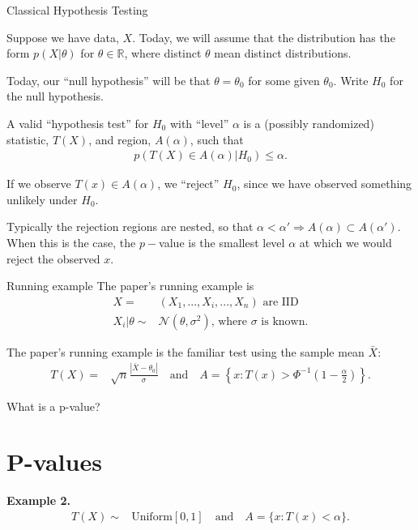 


\begin{frame}{Classical Hypothesis Testing}


Suppose we have data, $X$.  Today, we will assume that the distribution has the
form $p(X | \theta)$ for $\theta \in \mathbb{R}$, where distinct $\theta$ mean
distinct distributions.

Today, our ``null hypothesis'' will be that $\theta = \theta_0$ for some given
$\theta_0$.  Write $H_0$ for the null hypothesis.

A valid ``hypothesis test'' for $H_0$ with ``level'' $\alpha$ is a (possibly
randomized) statistic, $T(X)$, and  region, $A(\alpha)$, such that
%
\begin{align*}
%
p(T(X) \in A(\alpha) | H_0) \le \alpha.
%
\end{align*}

If we observe $T(x) \in A(\alpha)$, we ``reject'' $H_0$, since we have observed
something unlikely under $H_0$.

Typically the rejection regions are nested, so that $\alpha < \alpha'
\Rightarrow A(\alpha) \subset A(\alpha')$.  When this is the case, the $p-$value
is the smallest level $\alpha$ at which we would reject the observed $x$.

\end{frame}





\begin{frame}{Running example}
%
The paper's running example is
%
\begin{align*}
%
X ={}& (X_1, ..., X_i, ..., X_n) \textrm{ are IID}\\
X_i | \theta \sim{}& \mathcal{N}(\theta, \sigma^2)\textrm{, where }\sigma\textrm{ is known}.
%
\end{align*}
%


The paper's running example is the familiar test using the sample mean
$\bar{X}$:
%
\begin{align*}
%
T(X) ={}& \sqrt{n} \frac{|\bar{X} - \theta_0|}{\sigma}
\quad\textrm{and}\quad
A = \left\{x: T(x) > \Phi^{-1}\left(1 - \frac{\alpha}{2}\right) \right\}.
%
\end{align*}

\end{frame}


\begin{frame}{What is a p-value?}

\section{P-values}


\textbf{Example 2.}
%
\begin{align*}
%
T(X) \sim{}& \mathrm{Uniform}[0,1]
\quad\textrm{and}\quad
A = \{x: T(x) < \alpha \}.
%
\end{align*}

\end{frame}
